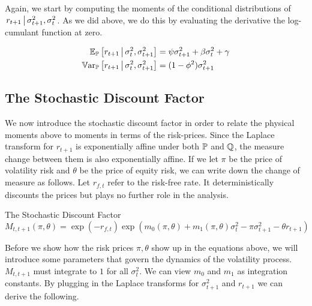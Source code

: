 \documentclass[11pt, letterpaper, twoside, final]{article}
\begin{document}
Again, we start by computing the moments of the conditional distributions of $\left. r_{t+1} \,\middle\vert\,
    \sigma^2_{t+1}, \sigma^2_t \right.$.
As we did above, we do this by evaluating the derivative the log-cumulant function at zero.

\begin{align}
    \operatorname{\mathbb{E}}_{\mathbb{P}}\left[r_{t+1} \,\middle\vert\, \sigma^2_t, \sigma^2_{t+1}\right]  &= \psi \sigma^2_{t+1}  + \beta \sigma^2_t +
    \gamma \\
    \operatorname{\mathbb{V}ar}_{\mathbb{P}}\left[r_{t+1} \,\middle\vert\, \sigma^2_t, \sigma^2_{t+1}\right]  &= (1 - \phi^2) \sigma^2_{t+1}  
    \label{eqn:rtn_cond_vol}
\end{align}


\subsection{The Stochastic Discount Factor}\label{sec:deriving_sdf_functions}

We now introduce the stochastic discount factor in order to relate the physical moments above to moments in terms
of the risk-prices.
Since the Laplace transform for $r_{t+1}$  is exponentially affine under both $\mathbb{P}$ and $\mathbb{Q}$, the measure change
between them is also exponentially affine.
If we let $\pi$ be the price of volatility risk and $\theta$ be the price of equity risk, we can write down the
change of measure as follows.
Let $r_{f,t}$ refer to the risk-free rate.
It deterministically discounts the prices but plays no further role in the analysis.

\begin{defn}{The Stochastic Discount Factor}
    \label{defn:SDF}
    \begin{equation}
        M_{t,t+1}(\pi, \theta) = \exp\left(-r_{f,t}\right) \exp\left(m_{0}(\pi, \theta) + m_1(\pi, \theta)
        \sigma_t^2 - \pi \sigma^2_{t+1} - \theta r_{t+1}\right) 
    \end{equation}
\end{defn}


Before we show how the risk prices $\pi, \theta$ show up in the equations above, we will introduce some parameters
that govern the dynamics of the volatility process.
$M_{t,t+1}$ must integrate to $1$ for all $\sigma^2_t$.
We can view $m_{0}$ and $m_1$ as integration constants.
By plugging in the Laplace transforms for $\sigma^2_{t+1}$ and $r_{t+1}$ we can derive the following.
\end{document}

